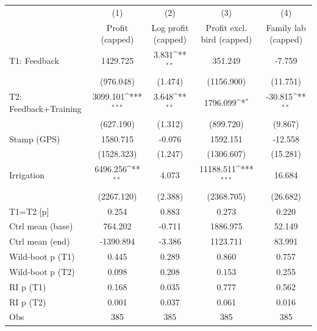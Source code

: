 {
\def\sym#1{\ifmmode^{#1}\else\(^{#1}\)\fi}
\begin{tabular}{l*{4}{c}}
\toprule
                    &\multicolumn{1}{c}{(1)}&\multicolumn{1}{c}{(2)}&\multicolumn{1}{c}{(3)}&\multicolumn{1}{c}{(4)}\\
                    &\multicolumn{1}{c}{Profit (capped)}&\multicolumn{1}{c}{Log profit (capped)}&\multicolumn{1}{c}{Profit excl. bird (capped)}&\multicolumn{1}{c}{Family lab (capped)}\\
\midrule
T1: Feedback        &    1429.725         &       3.831\sym{**} &     351.249         &      -7.759         \\
                    &   (976.048)         &     (1.474)         &  (1156.900)         &    (11.751)         \\
T2: Feedback+Training&    3099.101\sym{***}&       3.648\sym{**} &    1796.099\sym{*}  &     -30.815\sym{**} \\
                    &   (627.190)         &     (1.312)         &   (899.720)         &     (9.867)         \\
Stamp (GPS)         &    1580.715         &      -0.076         &    1592.151         &     -12.558         \\
                    &  (1528.323)         &     (1.247)         &  (1306.607)         &    (15.281)         \\
Irrigation          &    6496.256\sym{**} &       4.073         &   11188.511\sym{***}&      16.684         \\
                    &  (2267.120)         &     (2.388)         &  (2368.705)         &    (26.682)         \\
\midrule
T1=T2 [p]           &       0.254         &       0.883         &       0.273         &       0.220         \\
Ctrl mean (base)    &     764.202         &      -0.711         &    1886.975         &      52.149         \\
Ctrl mean (end)     &   -1390.894         &      -3.386         &    1123.711         &      83.991         \\
Wild-boot p (T1)    &       0.445         &       0.289         &       0.860         &       0.757         \\
Wild-boot p (T2)    &       0.098         &       0.208         &       0.153         &       0.255         \\
RI p (T1)           &       0.168         &       0.035         &       0.777         &       0.562         \\
RI p (T2)           &       0.001         &       0.037         &       0.061         &       0.016         \\
Obs                 &         385         &         385         &         385         &         385         \\
\bottomrule
\end{tabular}
}
